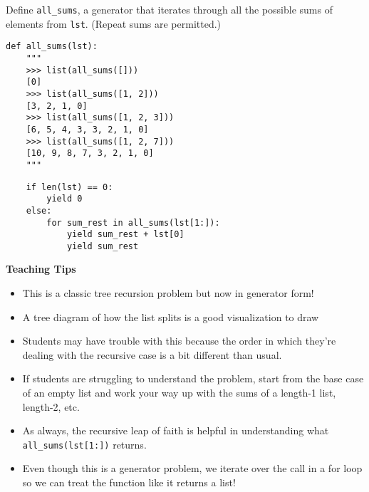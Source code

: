\begin{blocksection}
\question Define \lstinline$all_sums$, a generator that iterates through all the possible sums of elements from \lstinline$lst$. (Repeat sums are permitted.)
\begin{lstlisting}
def all_sums(lst):
    """
    >>> list(all_sums([]))
    [0] 
    >>> list(all_sums([1, 2]))
    [3, 2, 1, 0]
    >>> list(all_sums([1, 2, 3]))
    [6, 5, 4, 3, 3, 2, 1, 0]
    >>> list(all_sums([1, 2, 7]))
    [10, 9, 8, 7, 3, 2, 1, 0]
    """
\end{lstlisting}

\begin{solution}[1.5in]
\begin{lstlisting}
    if len(lst) == 0:
        yield 0
    else:
        for sum_rest in all_sums(lst[1:]):
            yield sum_rest + lst[0]
            yield sum_rest
\end{lstlisting}
\end{solution}
\end{blocksection}

\begin{blocksection}
    \begin{guide}
        \textbf{Teaching Tips}
        \begin{itemize}
            \item This is a classic tree recursion problem but now in generator form!
            \item A tree diagram of how the list splits is a good visualization to draw
            \item Students may have trouble with this because the order in which they're dealing with the recursive case is a bit different than usual.
            \item If students are struggling to understand the problem, start from the base case of an empty list and work your way up with the sums of a length-1 list, length-2, etc.
            \item As always, the recursive leap of faith is helpful in understanding what \lstinline{all_sums(lst[1:])} returns.
            \item Even though this is a generator problem, we iterate over the call in a for loop so we can treat the function like it returns a list!
        \end{itemize}
    \end{guide}
\end{blocksection}

